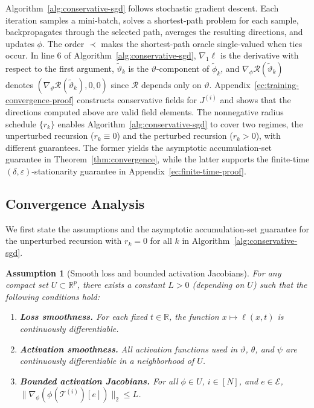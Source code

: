\documentclass[11pt, letterpaper, oneside, reqno]{amsart}
\newcommand{\R}{\mathbb{R}}
\newtheorem{assumption}{Assumption}
\begin{document}
Algorithm~\ref{alg:conservative-sgd} follows stochastic gradient descent. Each iteration samples a mini-batch, solves a shortest-path problem for each sample, backpropagates through the selected path, averages the resulting directions, and updates $\phi$. The order $\prec$ makes the shortest-path oracle single-valued when ties occur. In line 6 of Algorithm~\ref{alg:conservative-sgd}, $\nabla_1\ell$ is the derivative with respect to the first argument, $\tilde\vartheta_k$ is the $\vartheta$-component of $\tilde\phi_k$, and $\nabla_\phi\mathcal R(\tilde\vartheta_k)$ denotes $(\nabla_\vartheta\mathcal R(\tilde\vartheta_k),0,0)$ since $\mathcal R$ depends only on $\vartheta$. Appendix~\ref{ec:training-convergence-proof} constructs conservative fields for $J^{(i)}$ and shows that the directions computed above are valid field elements. 
The nonnegative radius schedule $\{r_k\}$ enables Algorithm~\ref{alg:conservative-sgd} to cover two regimes, the unperturbed recursion ($r_k\equiv0$) and the perturbed recursion ($r_k > 0$), with different guarantees. The former yields the asymptotic accumulation-set guarantee in Theorem~\ref{thm:convergence}, while the latter supports the finite-time $(\delta,\varepsilon)$-stationarity guarantee in Appendix~\ref{ec:finite-time-proof}.


\subsection{Convergence Analysis} \label{sec:training-convergence}

We first state the assumptions and the asymptotic accumulation-set guarantee for the unperturbed recursion with $r_k=0$ for all $k$ in Algorithm~\ref{alg:conservative-sgd}.

\begin{assumption}[Smooth loss and bounded activation Jacobians]
\label{assmpt:smoothness-bounded}
For any compact set $U\subset\R^p$, there exists a constant $L>0$ (depending on $U$) such that the following conditions hold:
\begin{enumerate}[label=(\alph*),leftmargin=7mm]
\item \textbf{Loss smoothness.} For each fixed $t \in \R$, the function $x \mapsto \ell(x, t)$ is continuously differentiable.
\item \textbf{Activation smoothness.} All activation functions used in $\vartheta$, $\theta$, and $\psi$ are continuously differentiable in a neighborhood of $U$.
\item \textbf{Bounded activation Jacobians.} For all $\phi \in U$, $i \in [N]$, and $e \in \mathcal E$, $\|\nabla_\phi(\phi(\mathcal T^{(i)})[e])\|_2 \le L$.
\end{enumerate}
\end{assumption}
\end{document}
